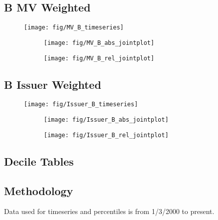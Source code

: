 \documentclass[12pt]{article}
\begin{document}
\subsection{B MV Weighted}
\begin{figure}[H]
	\centering
	\texttt{[image: fig/MV\_B\_timeseries]}
\end{figure}
\begin{figure}[H]
	\begin{subfigure}[t]{0.48\textwidth}
		\centering
		\texttt{[image: fig/MV\_B\_abs\_jointplot]}
	\end{subfigure}
	\hfill
	\begin{subfigure}[t]{0.48\textwidth}
		\centering
		\texttt{[image: fig/MV\_B\_rel\_jointplot]}
	\end{subfigure}
\end{figure}
\pagebreak

\subsection{B Issuer Weighted}
\begin{figure}[H]
	\centering
	\texttt{[image: fig/Issuer\_B\_timeseries]}
\end{figure}
\begin{figure}[H]
	\begin{subfigure}[t]{0.48\textwidth}
		\centering
		\texttt{[image: fig/Issuer\_B\_abs\_jointplot]}
	\end{subfigure}
	\hfill
	\begin{subfigure}[t]{0.48\textwidth}
		\centering
		\texttt{[image: fig/Issuer\_B\_rel\_jointplot]}
	\end{subfigure}
\end{figure}
\pagebreak

\subsection{Decile Tables}

\pagebreak
\subsection{Methodology}
Data used for timeseries and percentiles is from 1/3/2000 to present.\bigskip
\end{document}
